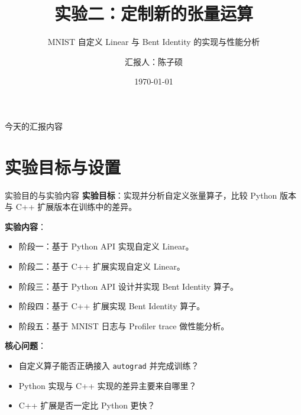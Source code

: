 \documentclass[10pt, aspectratio=169]{beamer}
\title[深度学习工具与平台]{实验二：定制新的张量运算}
\subtitle{MNIST 自定义 Linear 与 Bent Identity 的实现与性能分析}
\author[陈子硕]{汇报人：陈子硕}
\institute[人智2402]{人智2402}
\date[\today]{\today}
\begin{document}
\begin{frame}
    \titlepage
\end{frame}

\begin{frame}{今天的汇报内容}
    \tableofcontents
\end{frame}

\section{实验目标与设置}

\begin{frame}{实验目的与实验内容}
    \textbf{实验目标}：实现并分析自定义张量算子，比较 Python 版本与 C++ 扩展版本在训练中的差异。
    \vspace{0.25cm}

    \textbf{实验内容}：
    \begin{itemize}
        \item 阶段一：基于 Python API 实现自定义 Linear。
        \item 阶段二：基于 C++ 扩展实现自定义 Linear。
        \item 阶段三：基于 Python API 设计并实现 Bent Identity 算子。
        \item 阶段四：基于 C++ 扩展实现 Bent Identity 算子。
        \item 阶段五：基于 MNIST 日志与 Profiler trace 做性能分析。
    \end{itemize}

    \vspace{0.2cm}
    \textbf{核心问题}：
    \begin{itemize}
        \item 自定义算子能否正确接入 \texttt{autograd} 并完成训练？
        \item Python 实现与 C++ 实现的差异主要来自哪里？
        \item C++ 扩展是否一定比 Python 更快？
    \end{itemize}
\end{frame}
\end{document}
